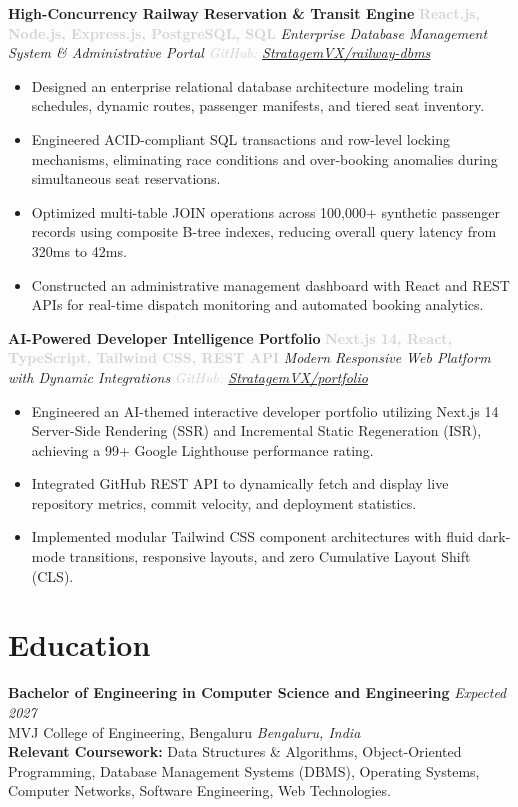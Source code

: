 \documentclass[a4paper,9pt]{article}
\newcommand{\projecttitle}[2]{\noindent\textbf{#1} \hfill \textcolor{lightgray}{\small\textbf{#2}}}
\newcommand{\projectsub}[2]{\noindent\textit{\small #1} \hfill \textcolor{lightgray}{\footnotesize\textit{#2}}}
\begin{document}
\vspace{0.3em}
\projecttitle{High-Concurrency Railway Reservation \& Transit Engine}{React.js, Node.js, Express.js, PostgreSQL, SQL}
\projectsub{Enterprise Database Management System \& Administrative Portal}{GitHub: \href{https://github.com/StratagemVX/railway-dbms}{StratagemVX/railway-dbms}}
\begin{itemize}
\item Designed an enterprise relational database architecture modeling train schedules, dynamic routes, passenger manifests, and tiered seat inventory.
\item Engineered ACID-compliant SQL transactions and row-level locking mechanisms, eliminating race conditions and over-booking anomalies during simultaneous seat reservations.
\item Optimized multi-table JOIN operations across 100,000+ synthetic passenger records using composite B-tree indexes, reducing overall query latency from 320ms to 42ms.
\item Constructed an administrative management dashboard with React and REST APIs for real-time dispatch monitoring and automated booking analytics.
\end{itemize}

\vspace{0.3em}
\projecttitle{AI-Powered Developer Intelligence Portfolio}{Next.js 14, React, TypeScript, Tailwind CSS, REST API}
\projectsub{Modern Responsive Web Platform with Dynamic Integrations}{GitHub: \href{https://github.com/StratagemVX/portfolio}{StratagemVX/portfolio}}
\begin{itemize}
\item Engineered an AI-themed interactive developer portfolio utilizing Next.js 14 Server-Side Rendering (SSR) and Incremental Static Regeneration (ISR), achieving a 99+ Google Lighthouse performance rating.
\item Integrated GitHub REST API to dynamically fetch and display live repository metrics, commit velocity, and deployment statistics.
\item Implemented modular Tailwind CSS component architectures with fluid dark-mode transitions, responsive layouts, and zero Cumulative Layout Shift (CLS).
\end{itemize}

\section*{Education}
\noindent
\textbf{Bachelor of Engineering in Computer Science and Engineering} \hfill \textit{Expected 2027} \\
\textnormal{MVJ College of Engineering, Bengaluru} \hfill \textit{Bengaluru, India} \\
\small \textbf{Relevant Coursework:} Data Structures \& Algorithms, Object-Oriented Programming, Database Management Systems (DBMS), Operating Systems, Computer Networks, Software Engineering, Web Technologies.
\end{document}
